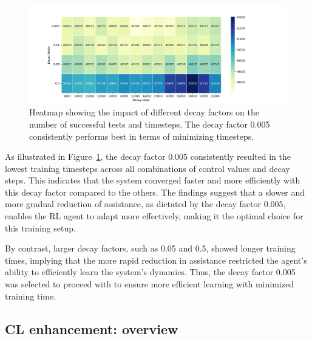 \begin{figure}[h] 
	\centering 
	\includegraphics[width=15cm]{Figures/MaxSuccessfulTestsTimesteps_heatmap.png} 
	\caption{Heatmap showing the impact of different decay factors on the number of successful tests and timesteps. The decay factor 0.005 consistently performs best in terms of minimizing timesteps.} 
	\label{fig: decay factors comparison}
\end{figure}

As illustrated in Figure~\ref{fig: decay factors comparison}, the decay factor 0.005 consistently resulted in the lowest training timesteps across all combinations of control values and decay steps. This indicates that the system converged faster and more efficiently with this decay factor compared to the others. The findings suggest that a slower and more gradual reduction of assistance, as dictated by the decay factor 0.005, enables the RL agent to adapt more effectively, making it the optimal choice for this training setup. 

By contrast, larger decay factors, such as 0.05 and 0.5, showed longer training times, implying that the more rapid reduction in assistance restricted the agent's ability to efficiently learn the system's dynamics. Thus, the decay factor 0.005 was selected to proceed with to ensure more efficient learning with minimized training time.

\subsection{CL enhancement: overview} 

